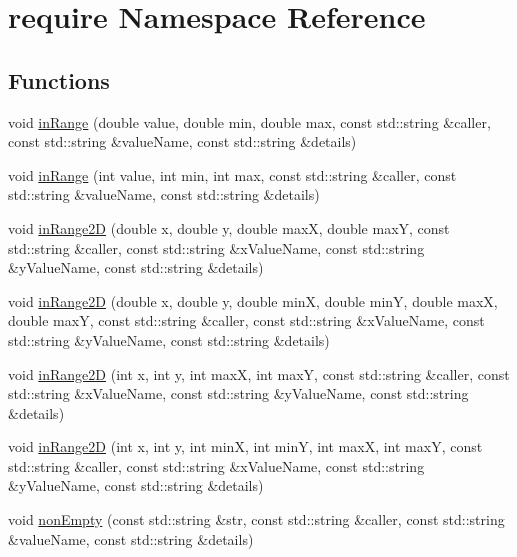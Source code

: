 \hypertarget{namespacerequire}{}\section{require Namespace Reference}
\label{namespacerequire}
\subsection*{Functions}
\begin{DoxyCompactItemize}
\item 
void \mbox{\hyperlink{namespacerequire_ad78e30d90d1c87a2b922f89edabbef38}{in\+Range}} (double value, double min, double max, const std\+::string \&caller, const std\+::string \&value\+Name, const std\+::string \&details)
\item 
void \mbox{\hyperlink{namespacerequire_a2bed18b6b26c6992e2fd619f5d02901e}{in\+Range}} (int value, int min, int max, const std\+::string \&caller, const std\+::string \&value\+Name, const std\+::string \&details)
\item 
void \mbox{\hyperlink{namespacerequire_a97b809ede8444f0621dde4323bdc2bf7}{in\+Range2D}} (double x, double y, double maxX, double maxY, const std\+::string \&caller, const std\+::string \&x\+Value\+Name, const std\+::string \&y\+Value\+Name, const std\+::string \&details)
\item 
void \mbox{\hyperlink{namespacerequire_a9b881272950994dad8e16dde47c99f08}{in\+Range2D}} (double x, double y, double minX, double minY, double maxX, double maxY, const std\+::string \&caller, const std\+::string \&x\+Value\+Name, const std\+::string \&y\+Value\+Name, const std\+::string \&details)
\item 
void \mbox{\hyperlink{namespacerequire_a2955ad574e8a2ec60b21c34409332b5c}{in\+Range2D}} (int x, int y, int maxX, int maxY, const std\+::string \&caller, const std\+::string \&x\+Value\+Name, const std\+::string \&y\+Value\+Name, const std\+::string \&details)
\item 
void \mbox{\hyperlink{namespacerequire_ade06d050472e11a6b11e4076493d5a3a}{in\+Range2D}} (int x, int y, int minX, int minY, int maxX, int maxY, const std\+::string \&caller, const std\+::string \&x\+Value\+Name, const std\+::string \&y\+Value\+Name, const std\+::string \&details)
\item 
void \mbox{\hyperlink{namespacerequire_a9e6bb70ad494e8078ce303b10c3c758f}{non\+Empty}} (const std\+::string \&str, const std\+::string \&caller, const std\+::string \&value\+Name, const std\+::string \&details)

\end{DoxyCompactItemize}
